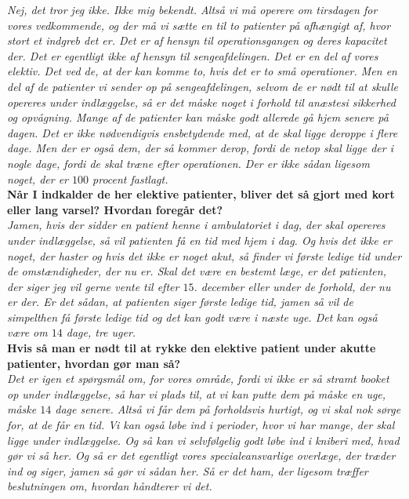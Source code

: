 \textit{Nej, det tror jeg ikke. Ikke mig bekendt. Altså vi må operere om tirsdagen for vores vedkommende, og der må vi sætte en til to patienter på afhængigt af, hvor stort et indgreb det er. Det er af hensyn til operationsgangen og deres kapacitet der. Det er egentligt ikke af hensyn til sengeafdelingen. Det er en del af vores elektiv. Det ved de, at der kan komme to, hvis det er to små operationer. Men en del af de patienter vi sender op på sengeafdelingen, selvom de er nødt til at skulle opereres under indlæggelse, så er det måske noget i forhold til anæstesi sikkerhed og opvågning. Mange af de patienter kan måske godt allerede gå hjem senere på dagen. Det er ikke nødvendigvis ensbetydende med, at de skal ligge deroppe i flere dage. Men der er også dem, der så kommer derop, fordi de netop skal ligge der i nogle dage, fordi de skal træne efter operationen. Der er ikke sådan ligesom noget, der er $100$ procent fastlagt.}\\
\textbf{Når I indkalder de her elektive patienter, bliver det så gjort med kort eller lang varsel? Hvordan foregår det?}\\
\noindent
\textit{Jamen, hvis der sidder en patient henne i ambulatoriet i dag, der skal opereres under indlæggelse, så vil patienten få en tid med hjem i dag. Og hvis det ikke er noget, der haster og hvis det ikke er noget akut, så finder vi første ledige tid under de omstændigheder, der nu er. Skal det være en bestemt læge, er det patienten, der siger jeg vil gerne vente til efter $15$. december eller under de forhold, der nu er der. Er det sådan, at patienten siger første ledige tid, jamen så vil de simpelthen få første ledige tid og det kan godt være i næste uge. Det kan også være om $14$ dage, tre uger.}\\
\textbf{Hvis så man er nødt til at rykke den elektive patient under akutte patienter, hvordan gør man så?}\\
\noindent
\textit{Det er igen et spørgsmål om, for vores område, fordi vi ikke er så stramt booket op under indlæggelse, så har vi plads til, at vi kan putte dem på måske en uge, måske $14$ dage senere. Altså vi får dem på forholdsvis hurtigt, og vi skal nok sørge for, at de får en tid. Vi kan også løbe ind i perioder, hvor vi har mange, der skal ligge under indlæggelse. Og så kan vi selvfølgelig godt løbe ind i kniberi med, hvad gør vi så her. Og så er det egentligt vores specialeansvarlige overlæge, der træder ind og siger, jamen så gør vi sådan her. Så er det ham, der ligesom træffer beslutningen om, hvordan håndterer vi det.}\\
